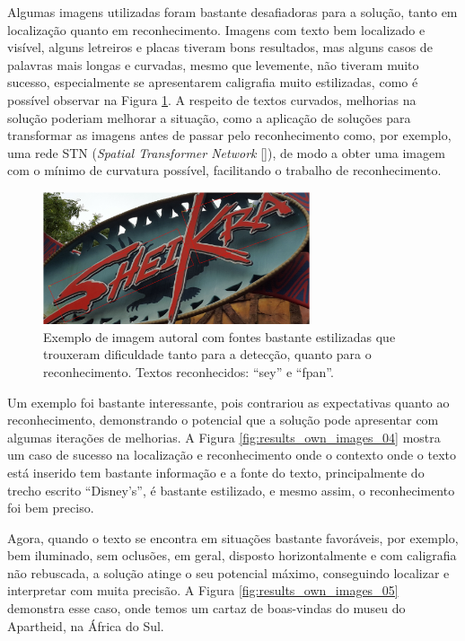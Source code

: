 Algumas imagens utilizadas foram bastante desafiadoras para a solução, tanto em localização quanto em reconhecimento. Imagens 
com texto bem localizado e visível, alguns letreiros e placas tiveram bons resultados, mas alguns casos de palavras mais longas 
e curvadas, mesmo que levemente, não tiveram muito sucesso, especialmente se apresentarem caligrafia muito estilizadas, como é 
possível observar na Figura \ref{fig:results_own_images_03}. A respeito de textos curvados, melhorias na solução poderiam 
melhorar a situação, como a aplicação de soluções para transformar as imagens antes de passar pelo reconhecimento como, por 
exemplo, uma rede STN (\textit{Spatial Transformer Network} []), de modo a obter uma imagem com o mínimo de 
curvatura possível, facilitando o trabalho de reconhecimento.

\begin{figure}
    \centering
    \includegraphics[width=0.7\textwidth]{figs/resultados-autoral-03.png}
    \caption{Exemplo de imagem autoral com fontes bastante estilizadas que trouxeram dificuldade tanto para a detecção, quanto 
    para o reconhecimento. Textos reconhecidos: “sey” e “fpan”.}
    \label{fig:results_own_images_03}
\end{figure}


Um exemplo foi bastante interessante, pois contrariou as expectativas quanto ao reconhecimento, demonstrando o potencial que a 
solução pode apresentar com algumas iterações de melhorias. A Figura \ref{fig:results_own_images_04} mostra um caso de sucesso 
na localização e reconhecimento onde o contexto onde o texto está inserido tem bastante informação e a fonte do texto, 
principalmente do trecho escrito “Disney’s”, é bastante estilizado, e mesmo assim, o reconhecimento foi bem preciso.


Agora, quando o texto se encontra em situações bastante favoráveis, por exemplo, bem iluminado, sem oclusões, em geral, disposto 
horizontalmente e com caligrafia não rebuscada, a solução atinge o seu potencial máximo, conseguindo localizar e interpretar 
com muita precisão. A Figura \ref{fig:results_own_images_05} demonstra esse caso, onde temos um cartaz de boas-vindas do 
museu do Apartheid, na África do Sul.

